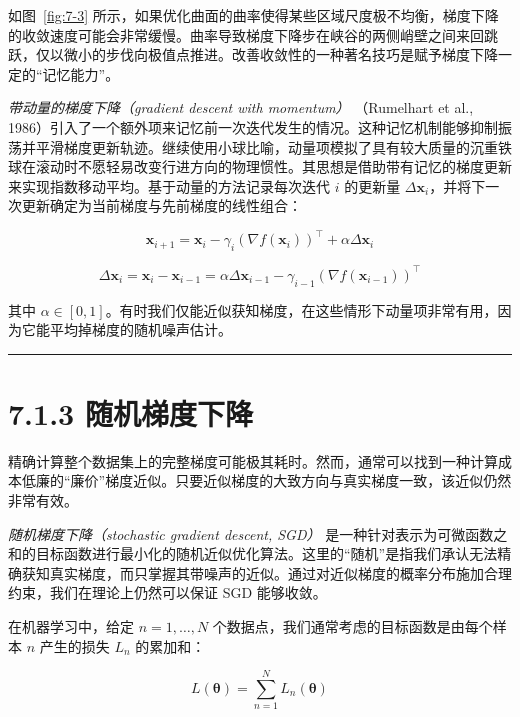 如图~\ref{fig:7-3} 所示，如果优化曲面的曲率使得某些区域尺度极不均衡，梯度下降的收敛速度可能会非常缓慢。曲率导致梯度下降步在峡谷的两侧峭壁之间来回跳跃，仅以微小的步伐向极值点推进。改善收敛性的一种著名技巧是赋予梯度下降一定的“记忆能力”。

\emph{带动量的梯度下降（gradient descent with momentum）} （Rumelhart et al., 1986）引入了一个额外项来记忆前一次迭代发生的情况。这种记忆机制能够抑制振荡并平滑梯度更新轨迹。继续使用小球比喻，动量项模拟了具有较大质量的沉重铁球在滚动时不愿轻易改变行进方向的物理惯性。其思想是借助带有记忆的梯度更新来实现指数移动平均。基于动量的方法记录每次迭代 $ i $ 的更新量 $ \Delta \boldsymbol{x}_i $，并将下一次更新确定为当前梯度与先前梯度的线性组合：

\begin{equation}
\boldsymbol{x}_{i+1} = \boldsymbol{x}_i - \gamma_i (\nabla f(\boldsymbol{x}_i))^\top + \alpha \Delta \boldsymbol{x}_i
\tag{7.11}\label{eq:7-11}
\end{equation}

\begin{equation}
\Delta \boldsymbol{x}_i = \boldsymbol{x}_i - \boldsymbol{x}_{i-1} = \alpha \Delta \boldsymbol{x}_{i-1} - \gamma_{i-1} (\nabla f(\boldsymbol{x}_{i-1}))^\top
\tag{7.12}\label{eq:7-12}
\end{equation}

其中 $ \alpha \in [0, 1] $。有时我们仅能近似获知梯度，在这些情形下动量项非常有用，因为它能平均掉梯度的随机噪声估计。

\medskip\hrule\medskip

\section*{7.1.3 随机梯度下降}

精确计算整个数据集上的完整梯度可能极其耗时。然而，通常可以找到一种计算成本低廉的“廉价”梯度近似。只要近似梯度的大致方向与真实梯度一致，该近似仍然非常有效。

\emph{随机梯度下降（stochastic gradient descent, SGD）} 是一种针对表示为可微函数之和的目标函数进行最小化的随机近似优化算法。这里的“随机”是指我们承认无法精确获知真实梯度，而只掌握其带噪声的近似。通过对近似梯度的概率分布施加合理约束，我们在理论上仍然可以保证 SGD 能够收敛。

在机器学习中，给定 $ n = 1, \ldots, N $ 个数据点，我们通常考虑的目标函数是由每个样本 $ n $ 产生的损失 $ L_n $ 的累加和：

\begin{equation}
L(\boldsymbol{\theta}) = \sum_{n=1}^N L_n(\boldsymbol{\theta})
\tag{7.13}\label{eq:7-13}
\end{equation}

